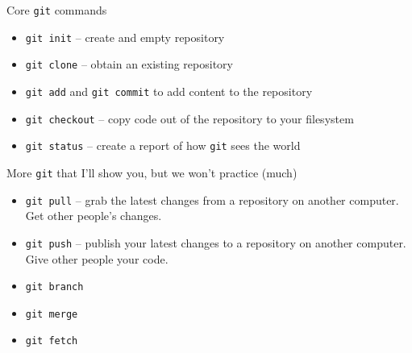 \documentclass[xcolor=dvipsnames,compress,12pt]{beamer}
\begin{document}
\begin{frame}{Core {\tt git} commands}
\large
\begin{itemize}
    \item {\tt git init}  -- create and empty repository
    \item {\tt git clone}  -- obtain an existing repository
    \item {\tt git add}  and {\tt git commit} to add content to the repository
    \item {\tt git checkout} -- copy code out of the repository to your filesystem
    \item {\tt git status} -- create a report of how {\tt git} sees the world
\end{itemize}

\end{frame}

\begin{frame}{More {\tt git} that I'll show you, but we won't practice (much)}
\large
\begin{itemize}
    \item {\tt git pull} -- grab the latest changes from a repository on another computer. Get other people's changes.
    \item {\tt git push} -- publish your latest changes to a repository on another computer. Give other people your code.
    \item {\tt git branch}
    \item {\tt git merge}
    \item {\tt git fetch}  
\end{itemize}

\end{frame}
\end{document}
